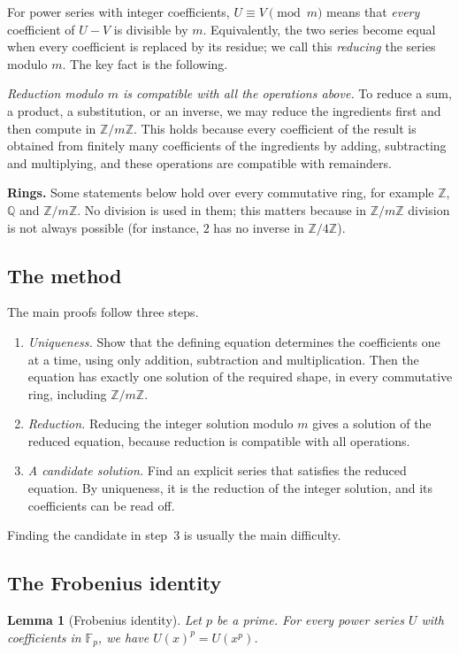 \documentclass[11pt,a4paper]{article}
\newtheorem{lemma}[theorem]{Lemma}
\theoremstyle{definition}
\theoremstyle{remark}
\newcommand{\Z}{\mathbb{Z}}
\newcommand{\Q}{\mathbb{Q}}
\newcommand{\F}{\mathbb{F}}
\newcommand{\para}[1]{\par\medskip\noindent\textbf{#1}\enspace}
\begin{document}
For power series with integer coefficients, $U\equiv V\pmod m$ means that \emph{every} coefficient of $U-V$ is
divisible by $m$. Equivalently, the two series become equal when every coefficient is replaced by its residue; we call
this \emph{reducing} the series modulo $m$. The key fact is the following.

\emph{Reduction modulo $m$ is compatible with all the operations above.} To reduce a sum, a product, a substitution, or
an inverse, we may reduce the ingredients first and then compute in $\Z/m\Z$. This holds because every
coefficient of the result is obtained from finitely many coefficients of the ingredients by adding, subtracting and
multiplying, and these operations are compatible with remainders.

\para{Rings.} Some statements below hold over every commutative ring, for example $\Z$, $\Q$ and $\Z/m\Z$. No
division is used in them; this matters because in $\Z/m\Z$ division is not always possible (for instance, $2$ has no inverse in
$\Z/4\Z$).

\subsection{The method}
The main proofs follow three steps.
\begin{enumerate}
\item \emph{Uniqueness.} Show that the defining equation determines the coefficients one at a time, using only
addition, subtraction and multiplication. Then the equation has exactly one solution of the required shape, in every
commutative ring, including $\Z/m\Z$.
\item \emph{Reduction.} Reducing the integer solution modulo $m$ gives a solution of the reduced equation,
because reduction is compatible with all operations.
\item \emph{A candidate solution.} Find an explicit series that satisfies the reduced equation. By uniqueness, it is
the reduction of the integer solution, and its coefficients can be read off.
\end{enumerate}
Finding the candidate in step~3 is usually the main difficulty.
\subsection{The Frobenius identity}
\begin{lemma}[Frobenius identity]\label{lem:frobenius}
Let $p$ be a prime. For every power series $U$ with coefficients in $\F_p$, we have $U(x)^p=U(x^p)$.
\end{lemma}
\end{document}
